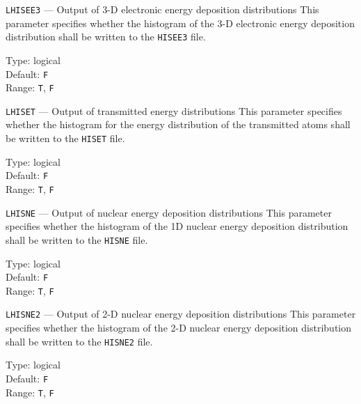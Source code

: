 \begin{keydescription}{\texttt{LHISEE3} --- Output of 3-D electronic energy deposition distributions}
%
  This parameter specifies whether the histogram of the 3-D electronic energy
  deposition distribution shall be written to the \texttt{HISEE3} file.
  \begin{keytab}
    Type:    \> logical \\
    Default: \> \texttt{F} \\
    Range:   \> \texttt{T}, \texttt{F} 
  \end{keytab}
\end{keydescription}

\begin{keydescription}{\texttt{LHISET} --- Output of transmitted energy distributions}
%
  This parameter specifies whether the histogram for the energy distribution of the 
  transmitted atoms shall be written to the \texttt{HISET} file.
  \begin{keytab}
    Type:    \> logical \\
    Default: \> \texttt{F} \\
    Range:   \> \texttt{T}, \texttt{F} 
  \end{keytab}
\end{keydescription}

\begin{keydescription}{\texttt{LHISNE} --- Output of nuclear energy deposition distributions}
%
  This parameter specifies whether the histogram of the 1D nuclear energy
  deposition distribution shall be written to the \texttt{HISNE} file.
  \begin{keytab}
    Type:    \> logical \\
    Default: \> \texttt{F} \\
    Range:   \> \texttt{T}, \texttt{F} 
  \end{keytab}
\end{keydescription}

\begin{keydescription}{\texttt{LHISNE2} --- Output of 2-D nuclear energy deposition distributions}
%
  This parameter specifies whether the histogram of the 2-D nuclear energy
  deposition distribution shall be written to the \texttt{HISNE2} file.
  \begin{keytab}
    Type:    \> logical \\
    Default: \> \texttt{F} \\
    Range:   \> \texttt{T}, \texttt{F} 
  \end{keytab}
\end{keydescription}

